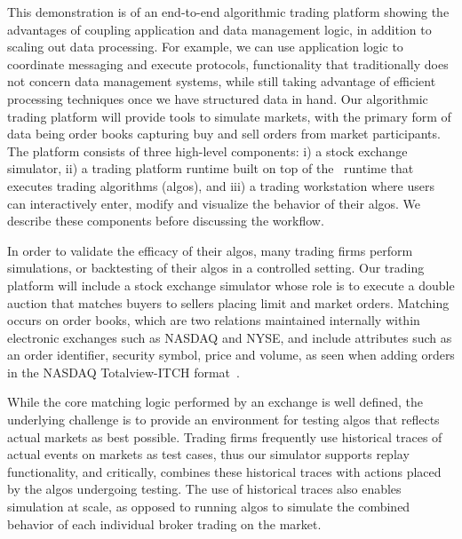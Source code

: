 \label{sec:trading}

This demonstration is of an end-to-end algorithmic trading platform showing the
advantages of coupling application and data management logic, in addition to
scaling out data processing. For example, we can use application logic to
coordinate messaging and execute protocols, functionality that traditionally
does not concern data management systems, while still taking advantage of
efficient processing techniques once we have structured data in hand. Our
algorithmic trading platform will provide tools to simulate markets, with the
primary form of data being order books capturing buy and sell orders from market
participants. The platform consists of three high-level components: i) a stock
exchange simulator, ii) a trading platform runtime built on top of the
\compiler\ runtime that executes trading algorithms (algos), and iii) a trading
workstation where users can interactively enter, modify and visualize the
behavior of their algos. We describe these components before discussing the
workflow.

 In order to validate the efficacy of
their algos, many trading firms perform simulations, or backtesting of their
algos in a controlled setting. Our trading platform will include a stock
exchange simulator whose role is to execute a double auction that matches buyers
to sellers placing limit and market orders. Matching occurs on order books,
which are two relations maintained internally within electronic exchanges such
as NASDAQ and NYSE, and include attributes such as an order identifier, security
symbol, price and volume, as seen when adding orders in the NASDAQ
Totalview-ITCH format~\cite{totalview-url}.

While the core matching logic performed by an exchange is well defined, the
underlying challenge is to provide an environment for testing algos that
reflects actual markets as best possible. Trading firms frequently use
historical traces of actual events on markets as test cases, thus our simulator
supports replay functionality, and critically, combines these historical traces
with actions placed by the algos undergoing testing. The use of historical
traces also enables simulation at scale, as opposed to running algos to simulate
the combined behavior of each individual broker trading on the market.


